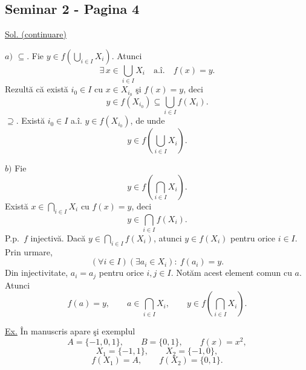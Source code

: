 
\subsection*{Seminar 2 - Pagina 4}

\noindent\underline{Sol. (continuare)}

\medskip
\noindent $a)$ \underline{$\subseteq$}.
Fie $y\in f\left(\bigcup_{i\in I}X_i\right)$. Atunci
\[
\exists\,x\in\bigcup_{i\in I}X_i\quad\text{a.î.}\quad f(x)=y.
\]
\noindent Rezultă că există $i_0\in I$ cu $x\in X_{i_0}$ şi $f(x)=y$, deci
\[
 y\in f(X_{i_0})\subseteq\bigcup_{i\in I}f(X_i).
\]
\noindent \underline{$\supseteq$}.
Există $i_0\in I$ a.î.
$y\in f(X_{i_0})$, de unde
\[
 y\in f\left(\bigcup_{i\in I}X_i\right).
\]

\medskip
\noindent $b)$ Fie
\[
 y\in f\left(\bigcap_{i\in I}X_i\right).
\]
\noindent Există $x\in\bigcap_{i\in I}X_i$ cu $f(x)=y$, deci
\[
 y\in\bigcap_{i\in I}f(X_i).
\]
\noindent P.p.\ $f$ injectivă. Dacă
$y\in\bigcap_{i\in I}f(X_i)$, atunci
$y\in f(X_i)$ pentru orice $i\in I$. Prin urmare,
\[
 (\forall i\in I)(\exists a_i\in X_i):\ f(a_i)=y.
\]
\noindent Din injectivitate, $a_i=a_j$ pentru orice $i,j\in I$.
Notăm acest element comun cu $a$. Atunci
\[
 f(a)=y,\qquad a\in\bigcap_{i\in I}X_i,
 \qquad y\in f\left(\bigcap_{i\in I}X_i\right).
\]

\medskip
\noindent\underline{Ex.} În manuscris apare şi exemplul
\[
 A=\{-1,0,1\},\qquad B=\{0,1\},\qquad f(x)=x^2,
\]
\[
 X_1=\{-1,1\},\qquad X_2=\{-1,0\},
\]
\[
 f(X_1)=A,\qquad f(X_2)=\{0,1\}.
\]

